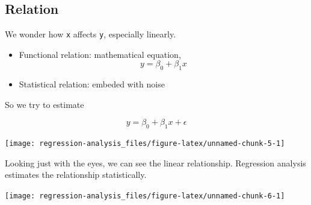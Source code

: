 \documentclass[]{book}
\newenvironment{Shaded}{\begin{snugshade}}{\end{snugshade}}
\newcommand{\DataTypeTok}[1]{\textcolor[rgb]{0.13,0.29,0.53}{#1}}
\newcommand{\KeywordTok}[1]{\textcolor[rgb]{0.13,0.29,0.53}{\textbf{#1}}}
\newcommand{\NormalTok}[1]{#1}
\newcommand{\OperatorTok}[1]{\textcolor[rgb]{0.81,0.36,0.00}{\textbf{#1}}}
\newcommand{\StringTok}[1]{\textcolor[rgb]{0.31,0.60,0.02}{#1}}
\providecommand{\tightlist}{%
  \setlength{\itemsep}{0pt}\setlength{\parskip}{0pt}}
\theoremstyle{definition}
\theoremstyle{definition}
\theoremstyle{definition}
\theoremstyle{remark}
\begin{document}
\hypertarget{relation}{%
\subsection*{Relation}\label{relation}}

We wonder how \texttt{x} affects \texttt{y}, especially linearly.

\begin{itemize}
\tightlist
\item
  Functional relation: mathematical equation, \[y = \beta_0 + \beta_1 x\]
\item
  Statistical relation: embeded with noise
\end{itemize}

So we try to estimate

\[y = \beta_0 + \beta_1 x + \epsilon\]

\begin{Shaded}
\end{Shaded}

\begin{center}\texttt{[image: regression-analysis\_files/figure-latex/unnamed-chunk-5-1]} \end{center}

Looking just with the eyes, we can see the linear relationship. Regression analysis estimates the relationship statistically.

\begin{Shaded}
\end{Shaded}

\begin{center}\texttt{[image: regression-analysis\_files/figure-latex/unnamed-chunk-6-1]} \end{center}
\end{document}
